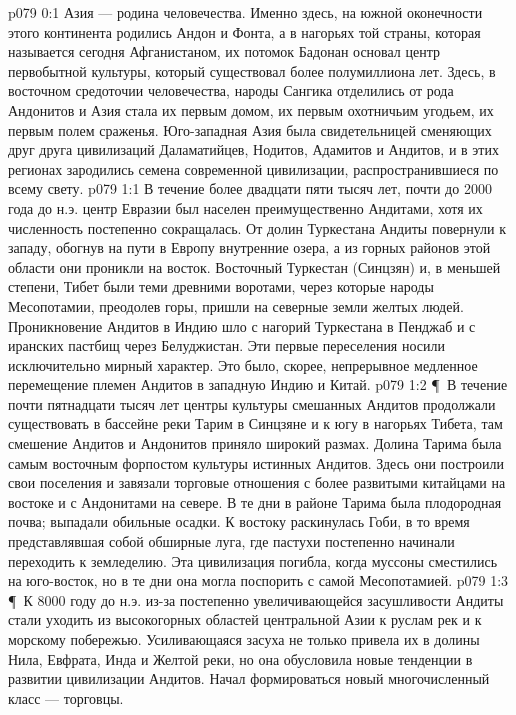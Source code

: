 \vs p079 0:1 Азия --- родина человечества. Именно здесь, на южной оконечности этого континента родились Андон и Фонта, а в нагорьях той страны, которая называется сегодня Афганистаном, их потомок Бадонан основал центр первобытной культуры, который существовал более полумиллиона лет. Здесь, в восточном средоточии человечества, народы Сангика отделились от рода Андонитов и Азия стала их первым домом, их первым охотничьим угодьем, их первым полем сраженья. Юго\hyp{}западная Азия была свидетельницей сменяющих друг друга цивилизаций Даламатийцев, Нодитов, Адамитов и Андитов, и в этих регионах зародились семена современной цивилизации, распространившиеся по всему свету.
\vs p079 1:1 В течение более двадцати пяти тысяч лет, почти до 2000 года до н.э. центр Евразии был населен преимущественно Андитами, хотя их численность постепенно сокращалась. От долин Туркестана Андиты повернули к западу, обогнув на пути в Европу внутренние озера, а из горных районов этой области они проникли на восток. Восточный Туркестан (Синцзян) и, в меньшей степени, Тибет были теми древними воротами, через которые народы Месопотамии, преодолев горы, пришли на северные земли желтых людей. Проникновение Андитов в Индию шло с нагорий Туркестана в Пенджаб и с иранских пастбищ через Белуджистан. Эти первые переселения носили исключительно мирный характер. Это было, скорее, непрерывное медленное перемещение племен Андитов в западную Индию и Китай.
\vs p079 1:2 \P\ В течение почти пятнадцати тысяч лет центры культуры смешанных Андитов продолжали существовать в бассейне реки Тарим в Синцзяне и к югу в нагорьях Тибета, там смешение Андитов и Андонитов приняло широкий размах. Долина Тарима была самым восточным форпостом культуры истинных Андитов. Здесь они построили свои поселения и завязали торговые отношения с более развитыми китайцами на востоке и с Андонитами на севере. В те дни в районе Тарима была плодородная почва; выпадали обильные осадки. К востоку раскинулась Гоби, в то время представлявшая собой обширные луга, где пастухи постепенно начинали переходить к земледелию. Эта цивилизация погибла, когда муссоны сместились на юго\hyp{}восток, но в те дни она могла поспорить с самой Месопотамией.
\vs p079 1:3 \P\ К 8000 году до н.э. из\hyp{}за постепенно увеличивающейся засушливости Андиты стали уходить из высокогорных областей центральной Азии к руслам рек и к морскому побережью. Усиливающаяся засуха не только привела их в долины Нила, Евфрата, Инда и Желтой реки, но она обусловила новые тенденции в развитии цивилизации Андитов. Начал формироваться новый многочисленный класс --- торговцы.
